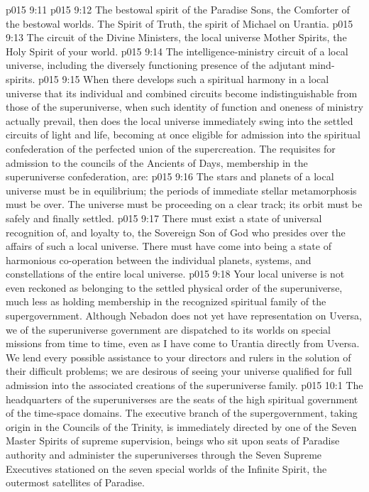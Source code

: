 \vs p015 9:11 \pc {}
\vs p015 9:12 \bibnobreakspace The bestowal spirit of the Paradise Sons, the Comforter of the bestowal worlds. The Spirit of Truth, the spirit of Michael on Urantia.
\vs p015 9:13 \bibnobreakspace The circuit of the Divine Ministers, the local universe Mother Spirits, the Holy Spirit of your world.
\vs p015 9:14 \bibnobreakspace The intelligence\hyp{}ministry circuit of a local universe, including the diversely functioning presence of the adjutant mind\hyp{}spirits.
\vs p015 9:15 \pc When there develops such a spiritual harmony in a local universe that its individual and combined circuits become indistinguishable from those of the superuniverse, when such identity of function and oneness of ministry actually prevail, then does the local universe immediately swing into the settled circuits of light and life, becoming at once eligible for admission into the spiritual confederation of the perfected union of the supercreation. The requisites for admission to the councils of the Ancients of Days, membership in the superuniverse confederation, are:
\vs p015 9:16 \bibnobreakspace {} The stars and planets of a local universe must be in equilibrium; the periods of immediate stellar metamorphosis must be over. The universe must be proceeding on a clear track; its orbit must be safely and finally settled.
\vs p015 9:17 \bibnobreakspace {} There must exist a state of universal recognition of, and loyalty to, the Sovereign Son of God who presides over the affairs of such a local universe. There must have come into being a state of harmonious co\hyp{}operation between the individual planets, systems, and constellations of the entire local universe.
\vs p015 9:18 \pc Your local universe is not even reckoned as belonging to the settled physical order of the superuniverse, much less as holding membership in the recognized spiritual family of the supergovernment. Although Nebadon does not yet have representation on Uversa, we of the superuniverse government are dispatched to its worlds on special missions from time to time, even as I have come to Urantia directly from Uversa. We lend every possible assistance to your directors and rulers in the solution of their difficult problems; we are desirous of seeing your universe qualified for full admission into the associated creations of the superuniverse family.
\vs p015 10:1 The headquarters of the superuniverses are the seats of the high spiritual government of the time\hyp{}space domains. The executive branch of the supergovernment, taking origin in the Councils of the Trinity, is immediately directed by one of the Seven Master Spirits of supreme supervision, beings who sit upon seats of Paradise authority and administer the superuniverses through the Seven Supreme Executives stationed on the seven special worlds of the Infinite Spirit, the outermost satellites of Paradise.
